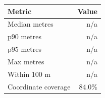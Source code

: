 \begin{tabular}{lr}
\toprule
Metric & Value \\
\midrule
Median metres & n/a \\
p90 metres & n/a \\
p95 metres & n/a \\
Max metres & n/a \\
Within 100 m & n/a \\
Coordinate coverage & 84.0\% \\
\bottomrule
\end{tabular}

